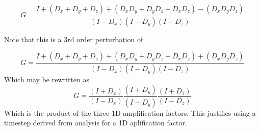 \documentclass[11pt]{article}
\begin{document}
\begin{equation}
	\boxed{
	G = 
	\frac{I+(D_x+D_y+D_z)+(D_xD_y+D_yD_z+D_xD_z)-(D_xD_yD_z)}{(I-D_x)(I-D_y)(I-D_z)}
	}
\end{equation}

Note that this is a 3rd order perturbation of 

\begin{equation}
	G = 
	\frac{I+(D_x+D_y+D_z)+(D_xD_y+D_yD_z+D_xD_z)+(D_xD_yD_z)}{(I-D_x)(I-D_y)(I-D_z)}
\end{equation}
Which may be rewritten as
\begin{equation}
	G = 
	\frac{(I+D_x)}{(I-D_x)}
	\frac{(I+D_y)}{(I-D_y)}
	\frac{(I+D_z)}{(I-D_z)}
\end{equation}
Which is the product of the three 1D amplification factors. This justifies using a timestep derived from analysis for a 1D aplification factor.
\end{document}
